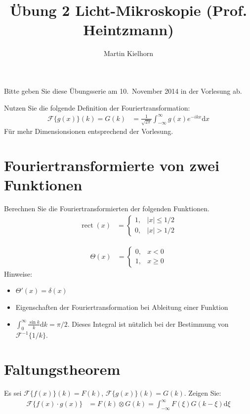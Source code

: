 \documentclass{article}
\DeclareMathOperator{\rect}{rect}
\begin{document}
\author{Martin Kielhorn}
\title{\"Ubung 2 Licht-Mikroskopie (Prof. Heintzmann)}
\maketitle

\noindent Bitte geben Sie diese \"Ubungsserie am 10.\ November 2014 in der Vorlesung ab.

\noindent Nutzen Sie die folgende Definition der Fouriertransformation:
\begin{align*}
  \mathcal{F}\{g(x)\}(k) = G(k) &= \frac{1}{\sqrt{2\pi}}\int_{-\infty}^\infty\!\!\! g(x) e^{-ikx} \textrm{d}x
\end{align*}
F\"ur mehr Dimensionsionen entsprechend der Vorlesung.

\section{Fouriertransformierte von zwei Funktionen}
Berechnen Sie die Fouriertransformierten der folgenden Funktionen.
\begin{align}
  \rect(x) &=\begin{cases}
  1, & |x|\le 1/2 \\
  0, & |x| > 1/2
  \end{cases}
\end{align}

\begin{align}
  \Theta(x)&=\begin{cases}
  0, & x<0 \\
  1, & x \ge 0
  \end{cases}
\end{align}
Hinweise:
\begin{itemize}
  \item $\Theta'(x)=\delta(x)$
  \item  Eigenschaften der Fouriertransformation bei Ableitung einer Funktion
  \item $\int_0^\infty \frac{\sin k}{k}\textrm{d}k=\pi/2$. Dieses
    Integral ist n\"utzlich bei der Bestimmung von
    $\mathcal{F}^{-1}\{1/k\}$.
\end{itemize}

\section{ Faltungstheorem}
Es sei $\mathcal{F}\{f(x)\}(k)=F(k)$, $\mathcal{F}\{g(x)\}(k)=G(k)$. Zeigen Sie:
\begin{align}
  \mathcal{F}\{f(x)\cdot g(x)\} &= F(k)\otimes G(k)=\int_{-\infty}^\infty\!\!\!\! F(\xi)G(k-\xi)
 \textrm{d}\xi
\end{align}
\end{document}
